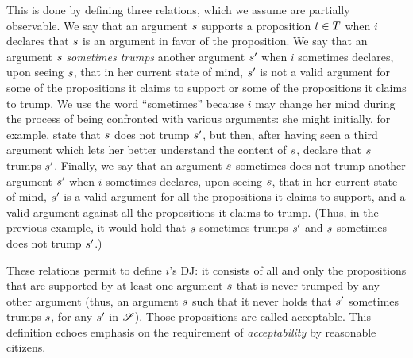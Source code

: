 \documentclass[version=3.21, pagesize, twoside=off, bibliography=totoc, DIV=calc, fontsize=12pt, a4paper, french, english]{scrartcl}
\begin{document}
This is done by defining three relations, which we assume are partially observable. We say that an argument $s$ supports a proposition $t \in T$ when $i$ declares that $s$ is an argument in favor of the proposition. We say that an argument $s$ \emph{sometimes trumps} another argument $s'$ when $i$ sometimes declares, upon seeing $s$, that in her current state of mind, $s'$ is not a valid argument for some of the propositions it claims to support or some of the propositions it claims to trump. We use the word ``sometimes'' because $i$ may change her mind during the process of being confronted with various arguments: she might initially, for example, state that $s$ does not trump $s'$, but then, after having seen a third argument which lets her better understand the content of $s$, declare that $s$ trumps $s'$. Finally, we say that an argument $s$ sometimes does not trump another argument $s'$ when $i$ sometimes declares, upon seeing $s$, that in her current state of mind, $s'$ is a valid argument for all the propositions it claims to support, and a valid argument against all the propositions it claims to trump. (Thus, in the previous example, it would hold that $s$ sometimes trumps $s'$ and $s$ sometimes does not trump $s'$.)

These relations permit to define $i$'s \ac{DJ}: it consists of all and only the propositions that are supported by at least one argument $s$ that is never trumped by any other argument (thus, an argument $s$ such that it never holds that $s'$ sometimes trumps $s$, for any $s'$ in $\mathscr{S}$). Those propositions are called acceptable. This definition echoes  emphasis on the requirement of \emph{acceptability} by reasonable citizens. 

\end{document}

